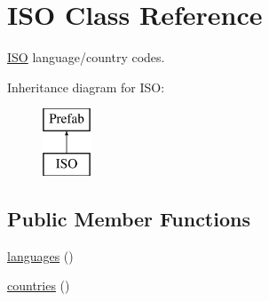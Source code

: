 \hypertarget{class_i_s_o}{}\section{I\+SO Class Reference}
\label{class_i_s_o}


\hyperlink{class_i_s_o}{I\+SO} language/country codes.  


Inheritance diagram for I\+SO\+:\begin{figure}[H]
\begin{center}
\leavevmode
\includegraphics[height=2.000000cm]{class_i_s_o}
\end{center}
\end{figure}
\subsection*{Public Member Functions}
\begin{DoxyCompactItemize}
\item 
\hyperlink{class_i_s_o_adda8fc15b6fe0efc05a50d2645189c77}{languages} ()
\item 
\hyperlink{class_i_s_o_a662d2f9a4067a75b295cff7ff65d658f}{countries} ()
\end{DoxyCompactItemize}
